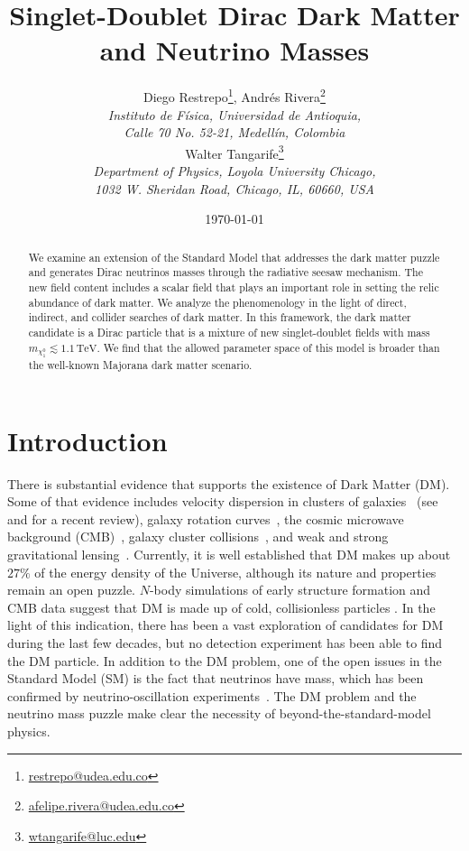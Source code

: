 \documentclass[12pt,letterpaper]{article}
\title{
Singlet-Doublet Dirac Dark Matter and Neutrino Masses
}
\author{Diego Restrepo\footnote{\href{mailto:restrepo@udea.edu.co}{restrepo@udea.edu.co}}, Andrés Rivera\footnote{\href{mailto:afelipe.rivera@udea.edu.co}{afelipe.rivera@udea.edu.co}}\\
\textit{\small  Instituto de F\'{i}sica, Universidad de Antioquia,} \\
\textit{\small  Calle 70 No. 52-21, Medell\'{i}n, Colombia}\\[4mm]
Walter Tangarife\footnote{\href{mailto:wtangarife@luc.edu}{wtangarife@luc.edu}}\\
\textit{\small Department of Physics, Loyola University Chicago,}\\
\textit{\small 1032 W. Sheridan Road, Chicago, IL, 60660, USA}
}
\date{\small \today}
\begin{document}
\maketitle
\begin{abstract}

We examine an extension of the Standard Model that addresses the dark matter puzzle and generates Dirac neutrinos masses through the radiative seesaw mechanism. 
The new field content includes a scalar field that plays an important role in setting the relic abundance of dark matter.
We analyze the phenomenology in the light of direct, indirect, and collider searches of dark matter.
In this framework, the dark matter candidate is a Dirac particle that is a mixture of new singlet-doublet fields with mass  $m_{\chi_1^0}\lesssim 1.1\,\text{TeV}$.
We find that the allowed parameter space of this model is broader than the well-known Majorana dark matter scenario.

\end{abstract}


\section{Introduction}

There is substantial evidence that supports the existence of Dark Matter (DM). Some of that evidence includes velocity dispersion in clusters of galaxies~\cite{Zwicky:1937zza} (see \cite{Gorenstein:2014iba} and for a recent review), galaxy rotation curves~\cite{Rubin:1970zza,Rubin:1980zd}, the cosmic microwave background (CMB)~\cite{Aghanim:2018eyx}, galaxy cluster collisions~\cite{clowebradacgonzalez2006}, and weak and strong gravitational lensing~\cite{Refregier:2003ct,Tyson:1998vp}. Currently, it is well established that DM makes up about $27\%$ of the energy density of the Universe, although its nature and properties remain an open puzzle.  
$N$-body simulations of early structure formation and CMB data suggest that DM is made up of cold, collisionless particles \cite{Frenk:2012ph}. 
In the light of this indication, there has been a vast exploration of candidates for DM during the last few decades, but no detection experiment has been able to find the DM particle.
In addition to the DM problem, one of the open issues in the Standard Model (SM) is the fact that neutrinos have mass, which has been confirmed by neutrino-oscillation experiments~\cite{deSalas:2017kay}. The DM problem and the neutrino mass puzzle make clear the necessity of beyond-the-standard-model physics.
\end{document}
